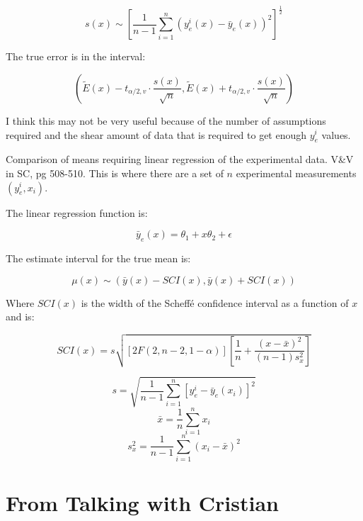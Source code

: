 \documentclass{article}
\begin{document}
\begin{equation}
  s(x) \sim \left [ \frac{1}{n-1} \sum^n_{i=1}\left ( y^i_e(x) - \bar{y}_e(x) \right ) ^2 \right ] ^\frac{1}{2}
\end{equation}

The true error is in the interval:

\begin{equation}
  \left ( \tilde{E}(x)-t_{\alpha/2,v}\cdot\frac{s(x)}{\sqrt{n}},\tilde{E}(x)+t_{\alpha/2,v}\cdot\frac{s(x)}{\sqrt{n}}  \right )
\end{equation}

I think this may not be very useful because of the number of
assumptions required and the shear amount of data that is required to
get enough $y^i_e$ values.

Comparison of means requiring linear regression of the experimental
data. V\&V in SC, pg 508-510. This is where there are a set of $n$
experimental measurements $(y^i_e,x_i)$.

The linear regression function is:

\begin{equation}
  \bar{y}_e(x) = \theta_1 + x\theta_2+\epsilon
\end{equation}

The estimate interval for the true mean is:

\begin{equation}
  \mu(x) \sim (\bar{y}(x) - SCI(x),\bar{y}(x)+SCI(x))
\end{equation}

Where $SCI(x)$ is the width of the Scheff\'e confidence interval as a function of $x$ and is:

\begin{equation}
  SCI(x) = s\sqrt{[2F(2,n-2,1-\alpha)]\left [ \frac{1}{n}+\frac{(x-\bar{x})^2}{(n-1)s^2_x} \right ] }
\end{equation}

\begin{equation}
  s = \sqrt{\frac{1}{n-1}\sum^n_{i=1}\left [ y^i_e-\bar{y}_e(x_i) \right ]^2}
\end{equation}
\begin{equation}
  \bar{x} = \frac{1}{n}\sum^n_{i=1}x_i
\end{equation}
\begin{equation}
  s^2_x=\frac{1}{n-1}\sum^n_{i=1}(x_i-\bar{x})^2
\end{equation}

\section{From Talking with Cristian}
\end{document}

